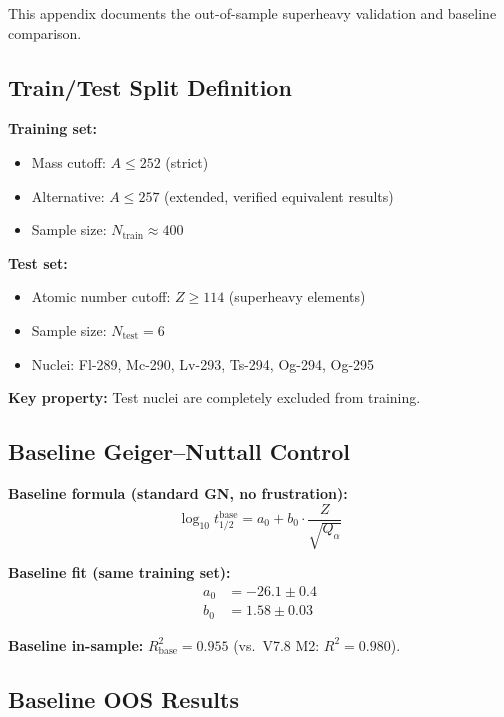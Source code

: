 \documentclass[11pt,a4paper]{article}
\begin{document}
This appendix documents the out-of-sample superheavy validation and baseline comparison.

\subsection{Train/Test Split Definition}

\textbf{Training set:}
\begin{itemize}[nosep]
    \item Mass cutoff: $A \leq 252$ (strict)
    \item Alternative: $A \leq 257$ (extended, verified equivalent results)
    \item Sample size: $N_{\text{train}} \approx 400$
\end{itemize}

\textbf{Test set:}
\begin{itemize}[nosep]
    \item Atomic number cutoff: $Z \geq 114$ (superheavy elements)
    \item Sample size: $N_{\text{test}} = 6$
    \item Nuclei: Fl-289, Mc-290, Lv-293, Ts-294, Og-294, Og-295
\end{itemize}

\textbf{Key property:} Test nuclei are completely excluded from training.

\subsection{Baseline Geiger--Nuttall Control}

\textbf{Baseline formula (standard GN, no frustration):}
\begin{equation}
    \log_{10} t_{1/2}^{\text{base}} = a_0 + b_0 \cdot \frac{Z}{\sqrt{Q_\alpha}}
    \label{eq:baseline_gn}
\end{equation}

\textbf{Baseline fit (same training set):}
\begin{align}
    a_0 &= -26.1 \pm 0.4 \\
    b_0 &= 1.58 \pm 0.03
\end{align}

\textbf{Baseline in-sample:} $R^2_{\text{base}} = 0.955$ (vs.\ V7.8 M2: $R^2 = 0.980$).

\subsection{Baseline OOS Results}
\end{document}
